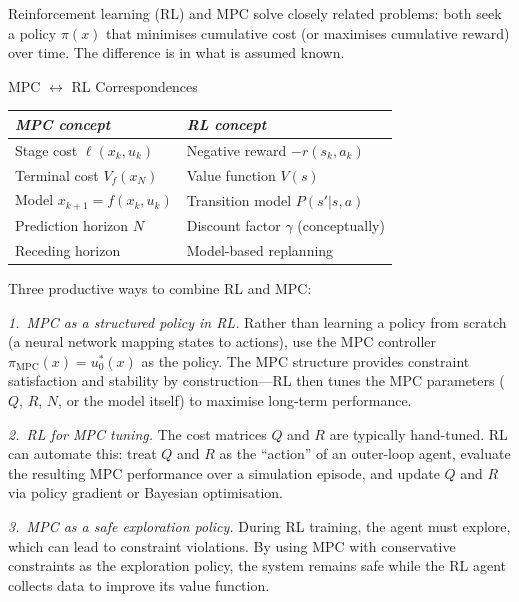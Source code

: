 Reinforcement learning (RL) and MPC solve closely related problems: both seek a policy $\pi(x)$ that minimises cumulative cost (or maximises cumulative reward) over time. The difference is in what is assumed known.

\begin{summarybox}{MPC $\leftrightarrow$ RL Correspondences}
	\begin{center}
		\begin{tabular}{l l}
			\toprule
			\emph{MPC concept} & \emph{RL concept} \\
			\midrule
			Stage cost $\ell(x_k, u_k)$ & Negative reward $-r(s_k, a_k)$ \\
			Terminal cost $V_f(x_N)$ & Value function $V(s)$ \\
			Model $x_{k+1} = f(x_k, u_k)$ & Transition model $P(s'|s, a)$ \\
			Prediction horizon $N$ & Discount factor $\gamma$ (conceptually) \\
			Receding horizon & Model-based replanning \\
			\bottomrule
		\end{tabular}
	\end{center}
\end{summarybox}

Three productive ways to combine RL and MPC:

\emph{1.\ MPC as a structured policy in RL.} Rather than learning a policy from scratch (a neural network mapping states to actions), use the MPC controller $\pi_\text{MPC}(x) = u_0^*(x)$ as the policy. The MPC structure provides constraint satisfaction and stability by construction---RL then tunes the MPC parameters ($Q$, $R$, $N$, or the model itself) to maximise long-term performance.

\emph{2.\ RL for MPC tuning.} The cost matrices $Q$ and $R$ are typically hand-tuned. RL can automate this: treat $Q$ and $R$ as the ``action'' of an outer-loop agent, evaluate the resulting MPC performance over a simulation episode, and update $Q$ and $R$ via policy gradient or Bayesian optimisation.

\emph{3.\ MPC as a safe exploration policy.} During RL training, the agent must explore, which can lead to constraint violations. By using MPC with conservative constraints as the exploration policy, the system remains safe while the RL agent collects data to improve its value function.

